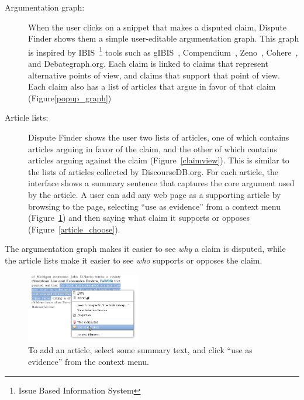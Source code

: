 \documentclass{www2010-accepted}
\begin{document}
\begin{description}
\item[Argumentation graph:] When the user clicks on a snippet that makes a disputed claim, Dispute Finder shows them a simple user-editable argumentation graph. This graph is inspired by IBIS~\footnote{Issue Based Information System} tools such as gIBIS~\cite{Conklin1987a}, Compendium~\cite{Selvin2001}, Zeno~\cite{Gordon1997}, Cohere~\cite{Shum2008}, and Debategraph.org. Each claim is linked to claims that represent alternative points of view, and claims that support that point of view. Each claim also has a list of articles that argue in favor of that claim (Figure\ref{popup_graph})

\item[Article lists:] Dispute Finder shows the user two lists of articles, one of which contains articles arguing in favor of the claim, and the other of which contains articles arguing against the claim (Figure~\ref{claimview}). This is similar to the lists of articles collected by DiscourseDB.org. For each article, the interface shows a summary sentence that captures the core argument used by the article. A user can add any web page as a supporting article by browsing to the page, selecting ``use as evidence'' from a context menu (Figure~\ref{add_article}) and then saying what claim it supports or opposes (Figure~\ref{article_choose}).
\end{description}

The argumentation graph makes it easier to see {\it why} a claim is disputed, while the article lists make it easier to see {\it who} supports or opposes the claim. 

\begin{figure}[tb]
	\begin{center}
	\includegraphics[width=5cm]{pictures/mark_evidence.png}
	\caption{To add an article, select some summary text, and click ``use as evidence'' from the context menu.}
	\label{add_article}
	\end{center}
\end{figure}
\end{document}
